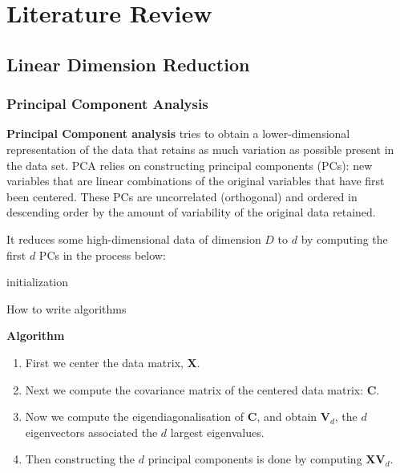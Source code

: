 \documentclass[12pt]{report}
\begin{document}
\chapter{Literature Review}

\section{Linear Dimension Reduction}

\subsection{Principal Component Analysis}

\textbf{Principal Component analysis} tries to obtain a 
lower-dimensional representation of the data 
that retains as much variation as possible present in the data set. 
PCA relies on constructing principal components (PCs): 
new variables that are linear combinations of the original variables 
that have first been centered.
These PCs are uncorrelated (orthogonal) and ordered in descending order 
by the amount of variability of the original data retained.

It reduces some high-dimensional data of dimension $D$ 
to $d$ by computing the first $d$ PCs
in the process below:\\
\begin{algorithm}[H]
    \SetAlgoLined
     initialization\;
     \caption{How to write algorithms}
    \end{algorithm}
\textbf{Algorithm}
\begin{enumerate}
    \item First we center the data matrix, $\mathbf{X}$.
    \item Next we compute the covariance matrix of 
    the centered data matrix: $\mathbf{C}$.
    \item Now we compute the eigendiagonalisation of $\mathbf{C}$,
    and obtain $\mathbf{V}_d$, the $d$ eigenvectors associated
    the $d$ largest eigenvalues.
    \item Then constructing the $d$ principal components
    is done by computing $\mathbf{X}\mathbf{V}_d$.
\end{enumerate}
\end{document}
